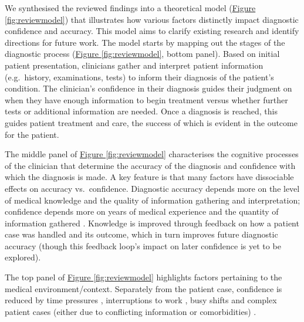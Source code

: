 \documentclass[a4paper, nobind]{templates/ociamthesis}
\begin{document}
We synthesised the reviewed findings into a theoretical model (\hyperref[fig:reviewmodel]{Figure \ref{fig:reviewmodel}}) that illustrates how various factors distinctly impact diagnostic confidence and accuracy. This model aims to clarify existing research and identify directions for future work. The model starts by mapping out the stages of the diagnostic process (\hyperref[fig:reviewmodel]{Figure \ref{fig:reviewmodel}}, bottom panel). Based on initial patient presentation, clinicians gather and interpret patient information (e.g.~history, examinations, tests) to inform their diagnosis of the patient's condition. The clinician's confidence in their diagnosis guides their judgment on when they have enough information to begin treatment versus whether further tests or additional information are needed. Once a diagnosis is reached, this guides patient treatment and care, the success of which is evident in the outcome for the patient.

The middle panel of \hyperref[fig:reviewmodel]{Figure \ref{fig:reviewmodel}} characterises the cognitive processes of the clinician that determine the accuracy of the diagnosis and confidence with which the diagnosis is made. A key feature is that many factors have dissociable effects on accuracy vs.~confidence. Diagnostic accuracy depends more on the level of medical knowledge and the quality of information gathering and interpretation; confidence depends more on years of medical experience and the quantity of information gathered \autocite{kostopoulou_information_2012,hautz_accuracy_2019,mamede_role_2024}. Knowledge is improved through feedback on how a patient case was handled and its outcome, which in turn improves future diagnostic accuracy (though this feedback loop's impact on later confidence is yet to be explored).

The top panel of \hyperref[fig:reviewmodel]{Figure \ref{fig:reviewmodel}} highlights factors pertaining to the medical environment/context. Separately from the patient case, confidence is reduced by time pressures \autocite{yang_effect_2012}, interruptions to work \autocite{soares_accuracy_2019}, busy shifts \autocite{gupta_associations_2023} and complex patient cases (either due to conflicting information or comorbidities) \autocite{meyer_physicians_2013,hausmann_sensitivity_2019,li_relationship_2023}.
\end{document}

